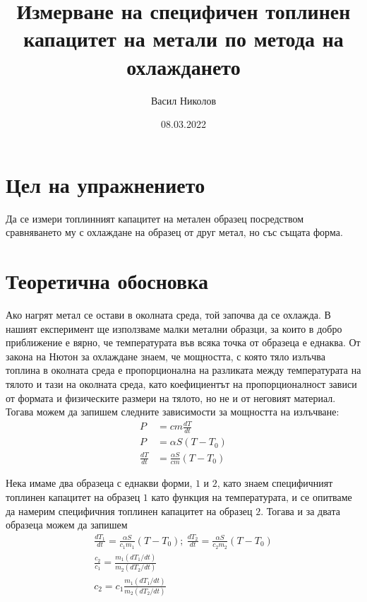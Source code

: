 \documentclass[
 reprint,
 amsmath,amssymb,
 aps,
]{revtex4-2}
\begin{document}
\setlength{\abovedisplayskip}{10pt}
\setlength{\belowdisplayskip}{10pt}    

\title{Измерване на специфичен топлинен капацитет на метали по метода на охлаждането}
\author{Васил Николов}
\date{08.03.2022}
\maketitle

\section{Цел на упражнението}

Да се измери топлинният капацитет на метален образец посредством сравняването му с охлаждане на образец от друг метал, но със същата форма. 

\section{Теоретична обосновка}

Ако нагрят метал се остави в околната среда, той започва да се охлажда. В нашият експеримент ще използваме малки метални образци, за които в добро приближение е вярно, че температурата във всяка точка от образеца е еднаква. От закона на Нютон за охлаждане знаем, че мощността, с която тяло излъчва топлина в околната среда е пропорционална на разликата между температурата на тялото и тази на околната среда, като коефициентът на пропорционалност зависи от формата и физическите размери на тялото, но не и от неговият материал. Тогава можем да запишем следните зависимости за мощността на излъчване:
\begin{align*}
    P &= cm\frac{dT}{dt} \\ 
    P &= \alpha S (T - T_0) \\
    \frac{dT}{dt} &= \frac{\alpha S}{cm} (T - T_0)
\end{align*}

Нека имаме два образеца с еднакви форми, $1$ и $2$, като знаем специфичният топлинен капацитет на образец $1$ като функция на температурата, и се опитваме да намерим специфичния топлинен капацитет на образец $2$. Тогава и за двата образеца можем да запишем 
\begin{gather*} 
    \frac{dT_1}{dt} = \frac{\alpha S}{c_1 m_1} (T - T_0); \  \frac{dT_2}{dt} = \frac{\alpha S}{c_2 m_2} (T - T_0) \\
    \frac{c_2}{c_1} = \frac{m_1 (dT_1/dt)}{m_2 (dT_2/dt)} \\
    c_2 = c_1 \frac{m_1 (dT_1/dt)}{m_2 (dT_2/dt)} \tag{1} \label{eq:1}
\end{gather*}
\end{document}
